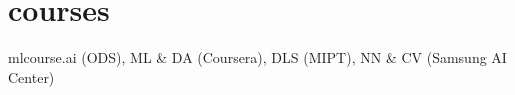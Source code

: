\section{courses}
  \begin{itemize}[leftmargin=0.15in, label={}]
    {\item{
        mlcourse.ai (ODS),
        ML \& DA (Coursera),
        DLS (MIPT),
        NN \& CV (Samsung AI Center) 
    }}
 \end{itemize}